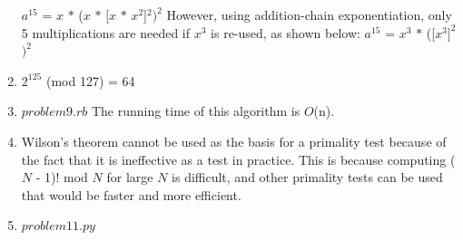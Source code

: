 \documentclass[12pt,letterpaper]{article}
\begin{document}
\begin{enumerate}
      \newline
      $a^{15}$ = $x$ $\ast$ ($x$ $\ast$ [$x$ \(\ast\) \(x^2\)]$^2$\()^2\)
      \newline
      However, using addition-chain exponentiation, only 5 multiplications are 	   	   needed if $x^3$ is re-used, as shown below:
      \newline
      $a^{15}$ = $x^3$ $\ast$ ([$x^3$\(]^2\)$)^2$
    \item
      $2^{125}$ (mod 127) = 64
    \item
      $problem9.rb$
      \newline
      The running time of this algorithm is \(O\)(n).
    \item
      Wilson's theorem cannot be used as the basis for a primality test because 	  of the fact that it is ineffective as a test in practice. This is because 	  computing ($N$ - 1)! mod $N$ for large $N$ is difficult, and other 			  primality tests can be used that would be faster and more efficient.
    \item
      $problem11.py$
    \end{enumerate}
    
\end{document}
